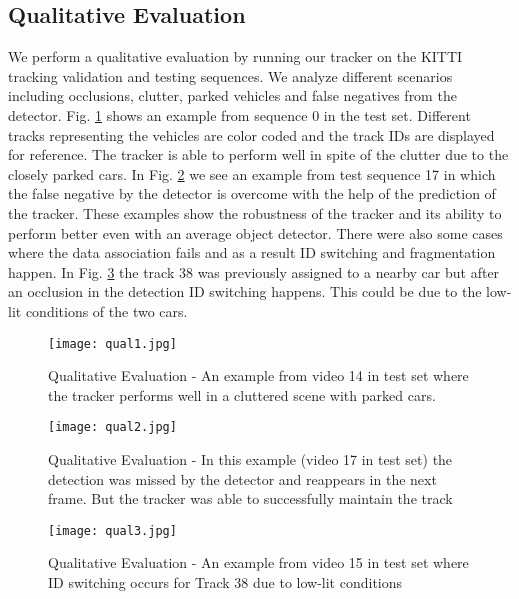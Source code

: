 \documentclass[letterpaper, 10 pt, conference]{ieeeconf}
\begin{document}
\subsection{Qualitative Evaluation}
We perform a qualitative evaluation by running our tracker on the KITTI tracking validation and testing sequences. We analyze different scenarios including occlusions, clutter, parked vehicles and false negatives from the detector. Fig. \ref{fig_qual1} shows an example from sequence 0 in the test set. Different tracks representing the vehicles are color coded and the track IDs are displayed for reference. The tracker is able to perform well in spite of the clutter due to the closely parked cars. In Fig. \ref{fig_qual2} we see an example from test sequence 17 in which the false negative by the detector is overcome with the help of the prediction of the tracker. These examples show the robustness of the tracker and its ability to perform better even with an average object detector. There were also some cases where the data association fails and as a result ID switching and fragmentation happen. In  Fig. \ref{fig_qual3} the track 38 was previously assigned to a nearby car but after an occlusion in the detection ID switching happens. This could be due to the low-lit conditions of the two cars.


\begin{figure}
\vspace{1em}
\begin{center}
\texttt{[image: qual1.jpg]}
\end{center}
\caption{Qualitative Evaluation - An example from video 14 in test set where the tracker performs well in a cluttered scene with parked cars.}
\label{fig_qual1}
\vspace{-1em}
\end{figure}

\begin{figure}[hbt]
\vspace{1em}
\begin{center}
\texttt{[image: qual2.jpg]}
\end{center}
\caption{Qualitative Evaluation - In this example (video 17 in test set) the detection was missed by the detector and reappears in the next frame. But the tracker was able to successfully maintain the track}
\label{fig_qual2}
\vspace{-1em}
\end{figure}

\begin{figure}[hbt]
\vspace{1.5em}
\begin{center}
\texttt{[image: qual3.jpg]}
\end{center}
\caption{Qualitative Evaluation - An example from video 15 in test set where ID switching occurs for Track 38 due to low-lit conditions}
\label{fig_qual3}
\vspace{-1.5em}
\end{figure}
\end{document}
